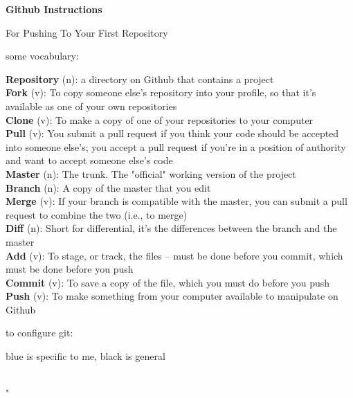 \documentclass[11pt,obeyspaces]{article}
\begin{document}
\centerline{\bf \Huge Github Instructions}
\centerline{\sc For Pushing To Your First Repository}
\bigskip

\begin{framed}
\centerline{\sc some vocabulary:} 
{\bf Repository} (n): a directory on Github that contains a project \\
{\bf Fork} (v): To copy someone else's repository into your profile, so that it's available as one of your own repositories \\
{\bf Clone} (v): To make a copy of one of your repositories to your computer \\
{\bf Pull} (v): You submit a pull request if you think your code should be accepted into someone else's; you accept a pull request if you're in a position of authority and want to accept someone else's code\\
{\bf Master} (n): The trunk. The "official" working version of the project \\
{\bf Branch} (n): A copy of the master that you edit \\
{\bf Merge} (v): If your branch is compatible with the master, you can submit a pull request to combine the two (i.e., to merge)\\
{\bf Diff} (n): Short for differential, it's the differences between the branch and the master\\
{\bf Add} (v): To stage, or track, the files -- must be done before you commit, which must be done before you push \\
{\bf Commit} (v): To save a copy of the file, which you must do before you push \\
{\bf Push} (v): To make something from your computer available to manipulate on Github 
\end{framed}

\centerline{\sc to configure git:}
\centerline{\small blue is specific to me, black is general}
\textcolor{blue}{}\\
 "\textcolor{blue}{}\\ \\
\end{document}
